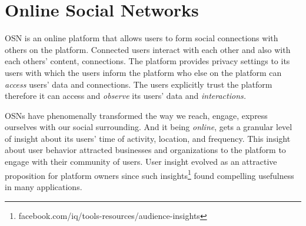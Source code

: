 \documentclass[runningheads]{llncs}
\begin{document}











\section{Online Social Networks}
\label{sec:social-networks}
\noindent OSN is an online platform that allows users to form social
connections with others on the platform. Connected users interact with
each other and also with each others' content, connections. The
platform provides privacy settings to its users with which the users
inform the platform who else on the platform can \textit{access}
users' data and connections. The users explicitly trust the platform
therefore it can access and \textit{observe} its users' data and
\textit{interactions.}

OSNs have phenomenally transformed the way we reach, engage, express
ourselves with our social surrounding. And it being \textit{online},
gets a granular level of insight about its users' time of activity,
location, and frequency. This insight about user behavior attracted
businesses and organizations to the platform to engage with their
community of users. User insight evolved as an attractive proposition
for platform owners since such
insights\footnote{facebook.com/iq/tools-resources/audience-insights}
found compelling usefulness in many applications.
\end{document}
